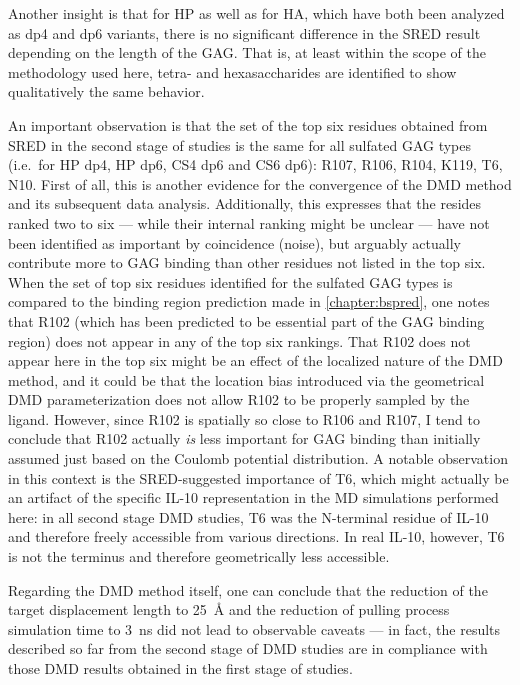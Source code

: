 Another insight is that for HP as well as for HA, which have both been analyzed
as dp4 and dp6 variants, there is no significant difference in the SRED result
depending on the length of the GAG. That is, at least within the scope of the
methodology used here, tetra- and hexasaccharides are identified to show
qualitatively the same behavior.

An important observation is that the set of the top six residues obtained from
SRED in the second stage of studies is the same for all sulfated GAG types
(i.e.\ for HP dp4, HP dp6, CS4 dp6 and CS6 dp6): R107, R106, R104, K119, T6,
N10. First of all, this is another evidence for the convergence of the DMD
method and its subsequent data analysis. Additionally, this expresses that the
resides ranked two to six --- while their internal ranking might be unclear ---
have not been identified as important by coincidence (noise), but arguably
actually contribute more to GAG binding than other residues not listed in the
top six. When the set of top six residues identified for the sulfated GAG types
is compared to the binding region prediction made in \cref{chapter:bspred}, one
notes that R102 (which has been predicted to be essential part of the GAG
binding region) does not appear in any of the top six rankings. That R102 does
not appear here in the top six might be an effect of the localized nature of the
DMD method, and it could be that the location bias introduced via the
geometrical DMD parameterization does not allow R102 to be properly sampled by
the ligand. However, since R102 is spatially so close to R106 and R107, I tend
to conclude that R102 actually \textit{is} less important for GAG binding than
initially assumed just based on the Coulomb potential distribution. A notable
observation in this context is the SRED-suggested importance of T6, which might
actually be an artifact of the specific IL-10 representation in the MD
simulations performed here: in all second stage DMD studies, T6 was the
N-terminal residue of IL-10 and therefore freely accessible from various
directions. In real IL-10, however, T6 is not the terminus and therefore
geometrically less accessible.

Regarding the DMD method itself, one can conclude that the reduction of the
target displacement length to \SI{25}{\angstrom} and the reduction of pulling
process simulation time to \SI{3}{\nano\second} did not lead to observable
caveats --- in fact, the results described so far from the second stage of DMD
studies are in compliance with those DMD results obtained in the first stage of
studies.


